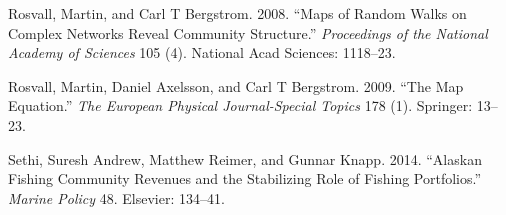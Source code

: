 \documentclass[]{article}
\begin{document}
Rosvall, Martin, and Carl T Bergstrom. 2008. ``Maps of Random Walks on
Complex Networks Reveal Community Structure.'' \emph{Proceedings of the
National Academy of Sciences} 105 (4). National Acad Sciences: 1118--23.

Rosvall, Martin, Daniel Axelsson, and Carl T Bergstrom. 2009. ``The Map
Equation.'' \emph{The European Physical Journal-Special Topics} 178 (1).
Springer: 13--23.

Sethi, Suresh Andrew, Matthew Reimer, and Gunnar Knapp. 2014. ``Alaskan
Fishing Community Revenues and the Stabilizing Role of Fishing
Portfolios.'' \emph{Marine Policy} 48. Elsevier: 134--41.
\end{document}
